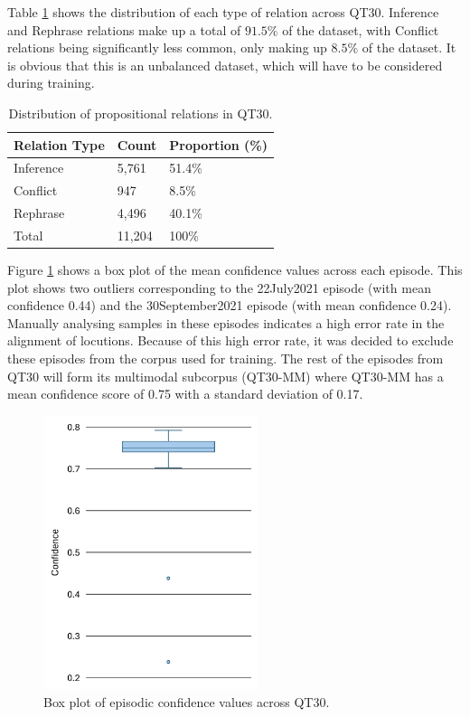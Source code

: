 \documentclass[twocolumn,twoside]{article}
\begin{document}
Table \ref{tbl:qt-rel} shows the distribution of each type of relation
across QT30. Inference and Rephrase relations make up a total of
\(91.5\%\) of the dataset, with Conflict relations being significantly
less common, only making up \(8.5\%\) of the dataset. It is obvious that
this is an unbalanced dataset, which will have to be considered during
training.

\begin{table}[h]
\centering
\caption{Distribution of propositional relations in QT30. \label{tbl:qt-rel}}
\begin{tabular}{|l|ll|}
\hline
Relation Type & Count & Proportion (\%) \\ \hline
Inference     & 5,761       & 51.4\%    \\
Conflict      & 947         & 8.5\%     \\
Rephrase      & 4,496       & 40.1\%    \\ \hline
Total         & 11,204      & 100\%     \\ \hline
\end{tabular}
\end{table}

Figure \ref{fig:qt30-confidence-box} shows a box plot of the mean
confidence values across each episode. This plot shows two outliers
corresponding to the 22July2021 episode (with mean confidence 0.44) and
the 30September2021 episode (with mean confidence 0.24). Manually
analysing samples in these episodes indicates a high error rate in the
alignment of locutions. Because of this high error rate, it was decided
to exclude these episodes from the corpus used for training. The rest of
the episodes from QT30 will form its multimodal subcorpus (QT30-MM)
where QT30-MM has a mean confidence score of 0.75 with a standard
deviation of 0.17.

\begin{figure}[h]
\centering
\includegraphics[height=8cm]{confidence-box}
\caption{Box plot of episodic confidence values across QT30. \label{fig:qt30-confidence-box}}
\end{figure}
\end{document}
